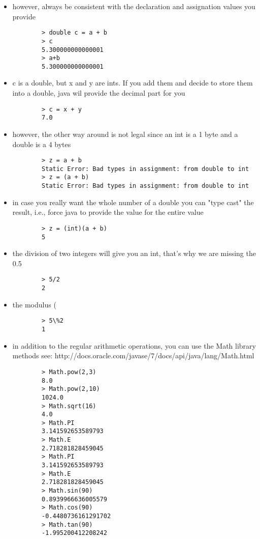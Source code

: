 \begin{itemize}
		\item however, always be consistent with the declaration and assignation values you provide
		\begin{verbatim}
		> double c = a + b
		> c
		5.300000000000001
		> a+b
		5.300000000000001
		\end{verbatim}
		\item c is a double, but x and y are ints. If you add them and decide to store them into a double, java wil provide the decimal part for you
		\begin{verbatim}
		> c = x + y
		7.0
		\end{verbatim}
		\item however, the other way around is not legal since an int is a 1 byte and a double is a 4 bytes
		\begin{verbatim}
		> z = a + b
		Static Error: Bad types in assignment: from double to int
		> z = (a + b)
		Static Error: Bad types in assignment: from double to int
		\end{verbatim}
		\item in case you really want the whole number of a double you can "type cast" the result, i.e., force java to provide the value for the entire value
		\begin{verbatim}
		> z = (int)(a + b)
		5
		\end{verbatim}
		\item the division of two integers will give you an int, that's why we are missing the 0.5
		\begin{verbatim}
		> 5/2
		2
		\end{verbatim}
		\item the modulus (%
		\begin{verbatim}
		> 5\%2
		1
		\end{verbatim}
		\item in addition to the regular arithmetic operations, you can use the Math library methods
		 see: http://docs.oracle.com/javase/7/docs/api/java/lang/Math.html
		\begin{verbatim}
		> Math.pow(2,3)
		8.0
		> Math.pow(2,10)
		1024.0
		> Math.sqrt(16)
		4.0
		> Math.PI
		3.141592653589793
		> Math.E
		2.718281828459045
		> Math.PI
		3.141592653589793
		> Math.E
		2.718281828459045
		> Math.sin(90)
		0.8939966636005579
		> Math.cos(90)
		-0.4480736161291702
		> Math.tan(90)
		-1.995200412208242
		\end{verbatim}
\end{itemize}
% 